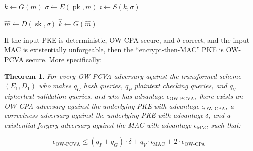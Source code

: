 \documentclass{article}
\newcommand{\pk}{\operatorname{pk}}
\newcommand{\sk}{\operatorname{sk}}
\newtheorem{theorem}{Theorem}[section]
\begin{document}
\begin{multicols}{2}
    \begin{algorithm}[H]
        \caption{$E_1$}
        \SetAlgoLined
        \KwIn{
            $\pk, m \in \mathcal{M}_\text{PKE}$
        }
        $k \leftarrow G(m)$\;
        $\sigma \leftarrow E(\pk, m)$\;
        $t \leftarrow S(k, \sigma)$\;
        \;
    \end{algorithm}

    \begin{algorithm}[H]
        \caption{$D_1$}
        \SetAlgoLined
        \KwIn{
            $\sk, c = (\sigma \in \mathcal{C}, t \in \mathcal{T})$
        }
        $\hat{m} \leftarrow D(\sk, \sigma)$\;
        $\hat{k} \leftarrow G(\hat{m})$\;
        \;
    \end{algorithm}
\end{multicols}

If the input PKE is deterministic, OW-CPA secure, and $\delta$-correct, and the input MAC is existentially unforgeable, then the ``encrypt-then-MAC'' PKE is OW-PCVA secure. More specifically:

\begin{theorem}\label{thm:if-ow-cpa-then-ow-pcva}
    For every OW-PCVA adversary against the transformed scheme $(E_1, D_1)$ who makes $q_G$ hash queries, $q_P$ plaintext checking queries, and $q_V$ ciphertext validation queries, and who has advantage $\epsilon_\text{OW-PCVA}$, there exists an OW-CPA adversary against the underlying PKE with advantage $\epsilon_\text{OW-CPA}$, a correctness adversary against the underlying PKE with advantage $\delta$, and a existential forgery adversary against the MAC with advantage $\epsilon_\text{MAC}$ such that:

    \begin{equation*}
        \epsilon_\text{OW-PCVA} 
        \leq (q_P + q_G) \cdot \delta
        + q_V \cdot \epsilon_\text{MAC}
        + 2 \cdot \epsilon_\text{OW-CPA}
    \end{equation*}
\end{theorem}
\end{document}
